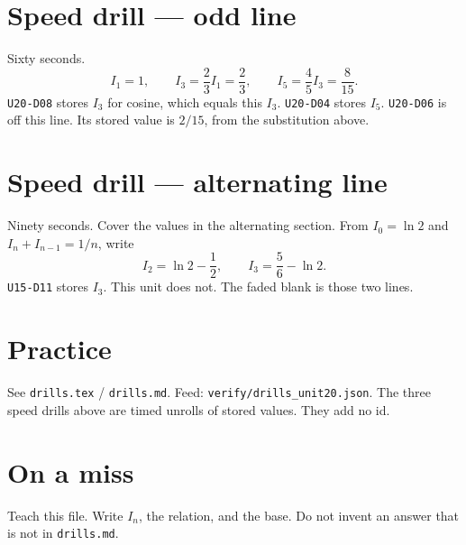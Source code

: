 \section{Speed drill --- odd line}
Sixty seconds.
\[
I_1=1,\qquad
I_3=\frac{2}{3}I_1=\frac{2}{3},\qquad
I_5=\frac{4}{5}I_3=\frac{8}{15}.
\]
\texttt{U20-D08} stores $I_3$ for cosine, which equals this $I_3$. \texttt{U20-D04} stores $I_5$. \texttt{U20-D06} is off this line. Its stored value is $2/15$, from the substitution above.

\section{Speed drill --- alternating line}
Ninety seconds. Cover the values in the alternating section. From $I_0=\ln 2$ and $I_n+I_{n-1}=1/n$, write
\[
I_2=\ln 2-\frac{1}{2},\qquad I_3=\frac{5}{6}-\ln 2.
\]
\texttt{U15-D11} stores $I_3$. This unit does not. The faded blank is those two lines.

\section{Practice}
See \texttt{drills.tex} / \texttt{drills.md}. Feed: \texttt{verify/drills\_unit20.json}. The three speed drills above are timed unrolls of stored values. They add no id.

\section*{On a miss}
Teach this file. Write $I_n$, the relation, and the base. Do not invent an answer that is not in \texttt{drills.md}.

